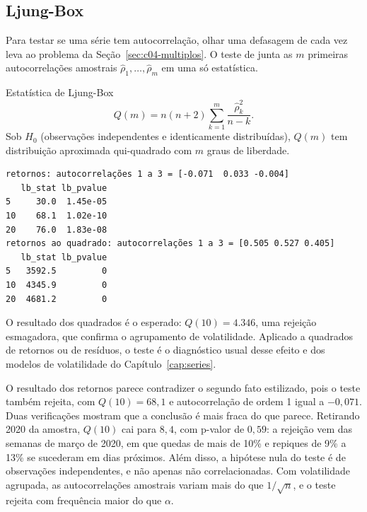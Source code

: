 \subsection{Ljung-Box}

Para testar se uma série tem autocorrelação, olhar uma defasagem de cada vez leva ao problema da Seção~\ref{sec:c04-multiplos}. O teste de \citet{ljung1978} junta as $m$ primeiras autocorrelações amostrais $\hat\rho_1, \dots, \hat\rho_m$ em uma só estatística.

\begin{resultado}{Estatística de Ljung-Box}
\begin{equation}
  Q(m) = n(n+2) \sum_{k=1}^{m} \frac{\hat\rho_k^2}{n-k} .
  \label{eq:c04-lb}
\end{equation}
Sob $H_0$ (observações independentes e identicamente distribuídas), $Q(m)$ tem distribuição aproximada qui-quadrado com $m$ graus de liberdade.
\end{resultado}


\begin{lstlisting}[style=saida]
retornos: autocorrelações 1 a 3 = [-0.071  0.033 -0.004]
   lb_stat lb_pvalue
5     30.0  1.45e-05
10    68.1  1.02e-10
20    76.0  1.83e-08
retornos ao quadrado: autocorrelações 1 a 3 = [0.505 0.527 0.405]
   lb_stat lb_pvalue
5   3592.5         0
10  4345.9         0
20  4681.2         0
\end{lstlisting}

O resultado dos quadrados é o esperado: $Q(10) = 4.346$, uma rejeição esmagadora, que confirma o agrupamento de volatilidade. Aplicado a quadrados de retornos ou de resíduos, o teste é o diagnóstico usual desse efeito e dos modelos de volatilidade do Capítulo~\ref{cap:series}.

O resultado dos retornos parece contradizer o segundo fato estilizado, pois o teste também rejeita, com $Q(10) = 68,1$ e autocorrelação de ordem 1 igual a $-0,071$. Duas verificações mostram que a conclusão é mais fraca do que parece. Retirando 2020 da amostra, $Q(10)$ cai para $8,4$, com p-valor de $0,59$: a rejeição vem das semanas de março de 2020, em que quedas de mais de 10\% e repiques de 9\% a 13\% se sucederam em dias próximos. Além disso, a hipótese nula do teste é de observações independentes, e não apenas não correlacionadas. Com volatilidade agrupada, as autocorrelações amostrais variam mais do que $1/\sqrt{n}$, e o teste rejeita com frequência maior do que $\alpha$.

